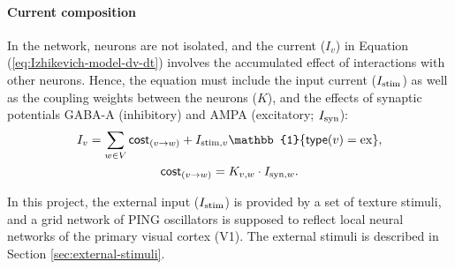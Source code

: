 \paragraph{Current composition}

In the network, neurons are not isolated, and the current ($I_v$) in Equation (\ref{eq:Izhikevich-model-dv-dt}) involves the accumulated effect of interactions with other neurons. Hence, the equation must include the input current ($I_{\mathrm{stim}}$) as well as the coupling weights between the neurons ($K$), and the effects of synaptic potentials GABA-A (inhibitory) and AMPA (excitatory; $I_{\mathrm{syn}}$):
\begin{gather}
    I_v = 
    \sum_{w \in V} \cost_{(v \to w)} + I_{\stim, v} \mathbb{1} \{ \type(v) = \ex \},  \label{eq:current-components} \\
    \cost_{(v \to w)} = K_{v, w} \cdot I_{\syn, w}. 
    \label{eq:cost-function}
\end{gather}

In this project, the external input ($I_{\mathrm{stim}}$) is provided by a set of texture stimuli, and a grid network of PING oscillators is supposed to reflect local neural networks of the primary visual cortex (V1). The external stimuli is described in Section \ref{sec:external-stimuli}.


